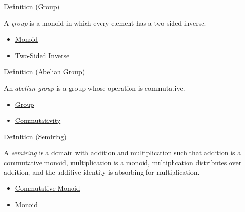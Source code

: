 \begin{definitionbox}{Definition (Group)}
\begin{definition}[Group]
\label{def:group}
A \emph{group} is a monoid in which every element has a two-sided inverse.
\end{definition}
\end{definitionbox}

\begin{dependencies}
\begin{itemize}
  \item \hyperref[def:monoid]{Monoid}
  \item \hyperref[def:two-sided-inverse]{Two-Sided Inverse}
\end{itemize}
\end{dependencies}

\begin{definitionbox}{Definition (Abelian Group)}
\begin{definition}
\label{def:abelian-group}
An \emph{abelian group} is a group whose operation is commutative.
\end{definition}
\end{definitionbox}

\begin{dependencies}
\begin{itemize}
  \item \hyperref[def:group]{Group}
  \item \hyperref[def:commutativity]{Commutativity}
\end{itemize}
\end{dependencies}

\begin{definitionbox}{Definition (Semiring)}
\begin{definition}[Semiring]
\label{def:semiring}
A \emph{semiring} is a domain with addition and multiplication such that
addition is a commutative monoid, multiplication is a monoid, multiplication
distributes over addition, and the additive identity is absorbing for
multiplication.
\end{definition}
\end{definitionbox}

\begin{dependencies}
\begin{itemize}
  \item \hyperref[def:commutative-monoid]{Commutative Monoid}
  \item \hyperref[def:monoid]{Monoid}
\end{itemize}
\end{dependencies}

